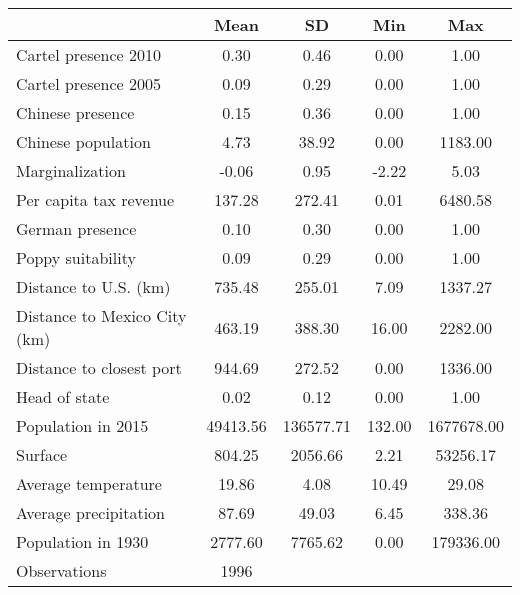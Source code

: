 {
\def\sym#1{\ifmmode^{#1}\else\(^{#1}\)\fi}
\begin{tabular}{l*{1}{cccc}}
\hline\hline
                    &        Mean&          SD&         Min&         Max\\
\hline
Cartel presence 2010&        0.30&        0.46&        0.00&        1.00\\
Cartel presence 2005&        0.09&        0.29&        0.00&        1.00\\
Chinese presence    &        0.15&        0.36&        0.00&        1.00\\
Chinese population  &        4.73&       38.92&        0.00&     1183.00\\
Marginalization     &       -0.06&        0.95&       -2.22&        5.03\\
Per capita tax revenue&      137.28&      272.41&        0.01&     6480.58\\
German presence     &        0.10&        0.30&        0.00&        1.00\\
Poppy suitability   &        0.09&        0.29&        0.00&        1.00\\
Distance to U.S. (km)&      735.48&      255.01&        7.09&     1337.27\\
Distance to Mexico City (km)&      463.19&      388.30&       16.00&     2282.00\\
Distance to closest port&      944.69&      272.52&        0.00&     1336.00\\
Head of state       &        0.02&        0.12&        0.00&        1.00\\
Population in 2015  &    49413.56&   136577.71&      132.00&  1677678.00\\
Surface             &      804.25&     2056.66&        2.21&    53256.17\\
Average temperature &       19.86&        4.08&       10.49&       29.08\\
Average precipitation&       87.69&       49.03&        6.45&      338.36\\
Population in 1930  &     2777.60&     7765.62&        0.00&   179336.00\\
\hline
Observations        &        1996&            &            &            \\
\hline\hline
\end{tabular}
}
